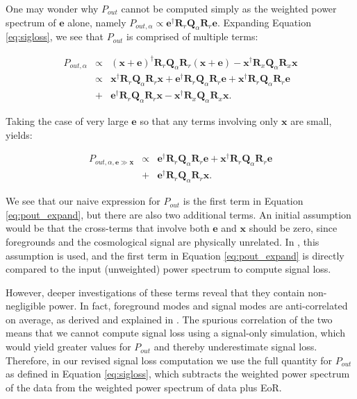 \documentclass[preprint2,numberedappendix,tighten]{aastex6}  %
\begin{document}
One may wonder why $P_{out}$ cannot be computed simply as the weighted power spectrum of $\textbf{e}$ alone, namely $P_{out,\alpha} \propto \textbf{e}^{\dagger}\textbf{R}_{r}\textbf{Q}_{\alpha}\textbf{R}_{r}\textbf{e}$. Expanding Equation \ref{eq:sigloss}, we see that $P_{out}$ is comprised of multiple terms:

\begin{eqnarray}
\label{eq:crossterm}
P_{out,\alpha} &\propto& (\textbf{x}+\textbf{e})^{\dagger}\textbf{R}_{r}\textbf{Q}_{\alpha}\textbf{R}_{r}(\textbf{x}+\textbf{e}) - \textbf{x}^{\dagger}\textbf{R}_{x}\textbf{Q}_{\alpha}\textbf{R}_{x}\textbf{x} \nonumber \\
&\propto& \textbf{x}^{\dagger}\textbf{R}_{r}\textbf{Q}_{\alpha}\textbf{R}_{r}\textbf{x} + \textbf{e}^{\dagger}\textbf{R}_{r}\textbf{Q}_{\alpha}\textbf{R}_{r}\textbf{e} + \textbf{x}^{\dagger}\textbf{R}_{r}\textbf{Q}_{\alpha}\textbf{R}_{r}\textbf{e} \nonumber \\
&+& \textbf{e}^{\dagger}\textbf{R}_{r}\textbf{Q}_{\alpha}\textbf{R}_{r}\textbf{x} - \textbf{x}^{\dagger}\textbf{R}_{x}\textbf{Q}_{\alpha}\textbf{R}_{x}\textbf{x}.
\end{eqnarray}

Taking the case of very large $\textbf{e}$ so that any terms involving only $\textbf{x}$ are small, yields:

\begin{eqnarray}
\label{eq:pout_expand}
P_{out, \alpha,\textbf{e} \gg \textbf{x}} &\propto& \textbf{e}^{\dagger}\textbf{R}_{r}\textbf{Q}_{\alpha}\textbf{R}_{r}\textbf{e} + \textbf{x}^{\dagger}\textbf{R}_{r}\textbf{Q}_{\alpha}\textbf{R}_{r}\textbf{e} \nonumber \\
&+& \textbf{e}^{\dagger}\textbf{R}_{r}\textbf{Q}_{\alpha}\textbf{R}_{r}\textbf{x}.
\end{eqnarray}

We see that our naive expression for $P_{out}$ is the first term in Equation \ref{eq:pout_expand}, but there are also two additional terms. An initial assumption would be that the cross-terms that involve both $\textbf{e}$ and $\textbf{x}$ should be zero, since foregrounds and the cosmological signal are physically unrelated. In \citet{ali_et_al2015}, this assumption is used, and the first term in Equation \ref{eq:pout_expand} is directly compared to the input (unweighted) power spectrum to compute signal loss.

However, deeper investigations of these terms reveal that they contain non-negligible power. In fact, foreground modes and signal modes are anti-correlated on average, as derived and explained in \citet{switzer_et_al2015}. The spurious correlation of the two means that we cannot compute signal loss using a signal-only simulation, which would yield greater values for $P_{out}$ and thereby underestimate signal loss. Therefore, in our revised signal loss computation we use the full quantity for $P_{out}$ as defined in Equation \ref{eq:sigloss}, which subtracts the weighted power spectrum of the data from the weighted power spectrum of data plus EoR. 
\end{document}
